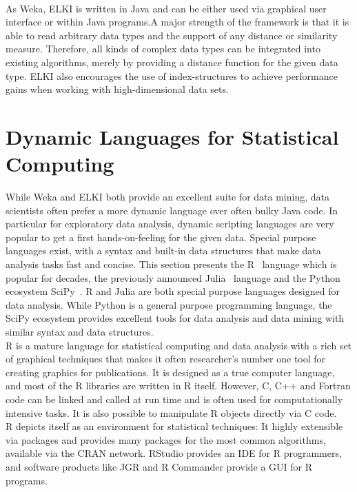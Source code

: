 \\
As Weka, ELKI is written in Java and can be either used via graphical user interface or within Java programs.A major strength of the framework is that it is able to read arbitrary data types and the support of any distance or similarity measure. Therefore, all kinds of complex data types can be integrated into existing algorithms, merely by providing a distance function for the given data type. ELKI also encourages the use of index-structures to achieve performance gains when working with high-dimensional data sets. 


\section{Dynamic Languages for Statistical Computing}

While Weka and ELKI both provide an excellent suite for data mining, data scientists often prefer a more dynamic language over often bulky Java code. In particular for exploratory data analysis, dynamic scripting languages are very popular to get a first hands-on-feeling for the given data. Special purpose languages exist, with a syntax and built-in data structures that make data analysis tasks fast and concise. This section presents the R~\parencite{R/stats} language which is popular for decades, the previously announced Julia~\parencite{DBLP:journals/corr/abs-1209-5145} language and the Python ecosystem SciPy~\parencite{scipy}. R and Julia are both special purpose languages designed for data analysis. While Python is a general purpose programming language, the SciPy ecosystem provides excellent tools for data analysis and data mining with similar syntax and data structures.
\\
R is a mature language for statistical computing and data analysis with a rich set of graphical techniques that makes it often researcher's number one tool for creating graphics for publications. It is designed as a true computer language, and most of the R libraries are written in R itself. However, C, C++ and Fortran code can be linked and called at run time and is often used for computationally intensive tasks. It is also possible to manipulate R objects directly via C code.
\\
R depicts itself as an environment for statistical techniques: It highly extensible via packages and provides many packages for the most common algorithms, available via the CRAN network. RStudio provides an IDE for R programmers, and software products like JGR and R Commander provide a GUI for R programs.
